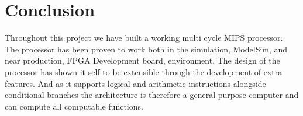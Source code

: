 \section{Conclusion}

Throughout this project we have built a working multi cycle MIPS processor. The processor
has been proven to work both in the simulation, ModelSim, and near production, FPGA Development board, environment.
The design of the processor has shown it self to be extensible through the development of extra
features. And as it supports logical and arithmetic instructions alongside conditional branches 
the architecture is therefore a general purpose computer and can compute all computable functions. 
